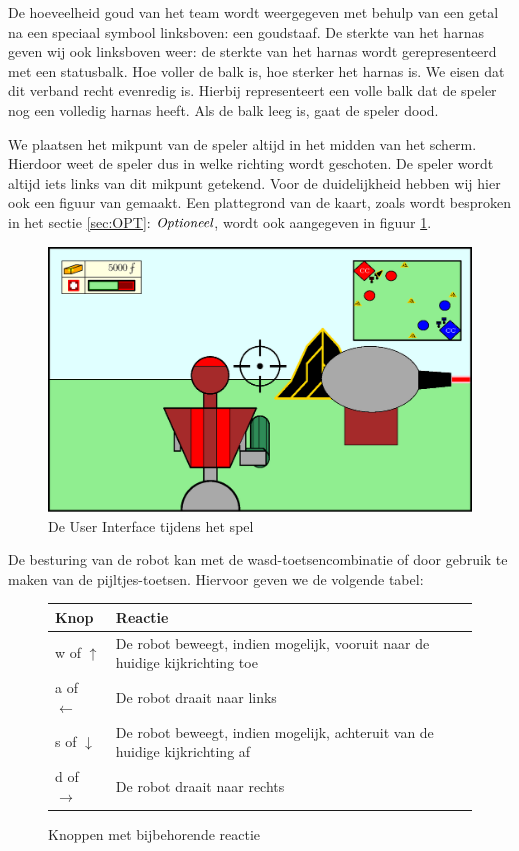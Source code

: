 De hoeveelheid goud van het team wordt weergegeven met behulp van een getal na een speciaal symbool linksboven: een goudstaaf. De sterkte van het harnas geven wij ook linksboven weer: de sterkte van het harnas wordt gerepresenteerd met een statusbalk. Hoe voller de balk is, hoe sterker het harnas is. We eisen dat dit verband recht evenredig is. Hierbij representeert een volle balk dat de speler nog een volledig harnas heeft. Als de balk leeg is, gaat de speler dood. 


We plaatsen het mikpunt van de speler altijd in het midden van het scherm. Hierdoor weet de speler dus in welke richting wordt geschoten. De speler wordt altijd iets links van dit mikpunt getekend. Voor de duidelijkheid hebben wij hier ook een figuur van gemaakt. Een plattegrond van de kaart, zoals wordt besproken in het sectie \ref{sec:OPT}: $\emph{Optioneel}$, wordt ook aangegeven in figuur \ref{fig:UI}.

\begin{figure}[h]
\includegraphics[width=\textwidth]{Graphics/UI.eps}
\caption{De User Interface tijdens het spel}
\label{fig:UI}
\end{figure}

De besturing van de robot kan met de wasd-toetsencombinatie of door gebruik te maken van de pijltjes-toetsen. Hiervoor geven we de volgende tabel:
\begin{figure}[H]
        \small
        \centering
        \begin{tabular}{| l | l |}
        \hline
        Knop & Reactie \\ \hline
        w of $\uparrow$ & De robot beweegt, indien mogelijk, vooruit naar de huidige kijkrichting toe \\ \hline
        a of $\leftarrow$ & De robot draait naar links \\ \hline
        s of $\downarrow$ & De robot beweegt, indien mogelijk, achteruit van de huidige kijkrichting af \\ \hline
        d of $\rightarrow$ & De robot draait naar rechts \\ \hline
        \end{tabular}
        \caption{Knoppen met bijbehorende reactie}
        \label{tab:planning}
    \end{figure}

